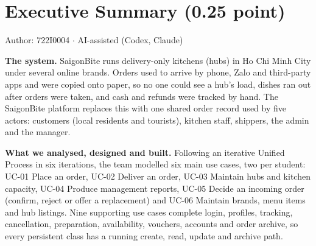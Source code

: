 \section*{Executive Summary (0.25 point)}
Author: 722I0004 \ensuremath{\cdot} AI-assisted (Codex, Claude)

\textbf{The system.} SaigonBite runs delivery-only kitchens (hubs) in Ho Chi Minh City under several online brands. Orders used to arrive by phone, Zalo and third-party apps and were copied onto paper, so no one could see a hub's load, dishes ran out after orders were taken, and cash and refunds were tracked by hand. The SaigonBite platform replaces this with one shared order record used by five actors: customers (local residents and tourists), kitchen staff, shippers, the admin and the manager.

\textbf{What we analysed, designed and built.} Following an iterative Unified Process in six iterations, the team modelled six main use cases, two per student: UC-01 Place an order, UC-02 Deliver an order, UC-03 Maintain hubs and kitchen capacity, UC-04 Produce management reports, UC-05 Decide an incoming order (confirm, reject or offer a replacement) and UC-06 Maintain brands, menu items and hub listings. Nine supporting use cases complete login, profiles, tracking, cancellation, preparation, availability, vouchers, accounts and order archive, so every persistent class has a running create, read, update and archive path.

